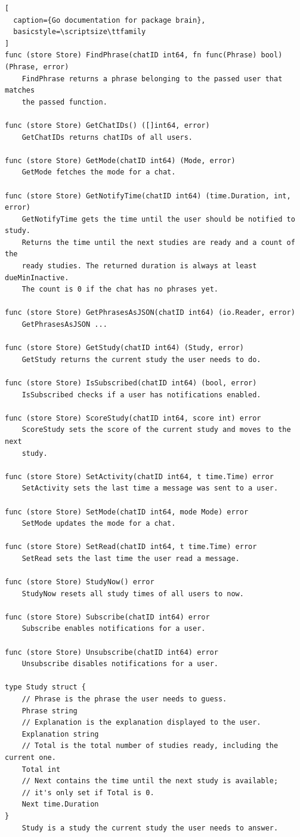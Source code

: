 \begin{lstlisting}[
  caption={Go documentation for package brain},
  basicstyle=\scriptsize\ttfamily
]
func (store Store) FindPhrase(chatID int64, fn func(Phrase) bool) (Phrase, error)
    FindPhrase returns a phrase belonging to the passed user that matches
    the passed function.

func (store Store) GetChatIDs() ([]int64, error)
    GetChatIDs returns chatIDs of all users.

func (store Store) GetMode(chatID int64) (Mode, error)
    GetMode fetches the mode for a chat.

func (store Store) GetNotifyTime(chatID int64) (time.Duration, int, error)
    GetNotifyTime gets the time until the user should be notified to study.
    Returns the time until the next studies are ready and a count of the
    ready studies. The returned duration is always at least dueMinInactive.
    The count is 0 if the chat has no phrases yet.

func (store Store) GetPhrasesAsJSON(chatID int64) (io.Reader, error)
    GetPhrasesAsJSON ...

func (store Store) GetStudy(chatID int64) (Study, error)
    GetStudy returns the current study the user needs to do.

func (store Store) IsSubscribed(chatID int64) (bool, error)
    IsSubscribed checks if a user has notifications enabled.

func (store Store) ScoreStudy(chatID int64, score int) error
    ScoreStudy sets the score of the current study and moves to the next
    study.

func (store Store) SetActivity(chatID int64, t time.Time) error
    SetActivity sets the last time a message was sent to a user.

func (store Store) SetMode(chatID int64, mode Mode) error
    SetMode updates the mode for a chat.

func (store Store) SetRead(chatID int64, t time.Time) error
    SetRead sets the last time the user read a message.

func (store Store) StudyNow() error
    StudyNow resets all study times of all users to now.

func (store Store) Subscribe(chatID int64) error
    Subscribe enables notifications for a user.

func (store Store) Unsubscribe(chatID int64) error
    Unsubscribe disables notifications for a user.

type Study struct {
    // Phrase is the phrase the user needs to guess.
    Phrase string
    // Explanation is the explanation displayed to the user.
    Explanation string
    // Total is the total number of studies ready, including the current one.
    Total int
    // Next contains the time until the next study is available;
    // it's only set if Total is 0.
    Next time.Duration
}
    Study is a study the current study the user needs to answer.
\end{lstlisting}
